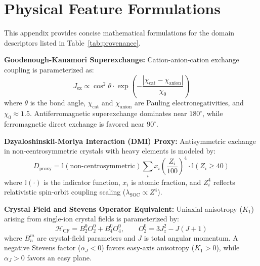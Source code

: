\documentclass[11pt,a4paper]{article}
\begin{document}
\newpage
\appendix

\section{Physical Feature Formulations}
\label{sec:appendix_physics}

This appendix provides concise mathematical formulations for the domain descriptors listed in Table~\ref{tab:provenance}.

\vspace{0.2cm}
\noindent\textbf{Goodenough-Kanamori Superexchange:} Cation-anion-cation exchange coupling is parameterized as:
\begin{equation}
    J_{\text{ex}} \propto \cos^2\theta \cdot \exp\left( - \frac{|\chi_{\text{cat}} - \chi_{\text{anion}}|}{\chi_0} \right)
\end{equation}
where $\theta$ is the bond angle, $\chi_{\text{cat}}$ and $\chi_{\text{anion}}$ are Pauling electronegativities, and $\chi_0 \approx 1.5$. Antiferromagnetic superexchange dominates near $180^\circ$, while ferromagnetic direct exchange is favored near $90^\circ$.

\vspace{0.2cm}
\noindent\textbf{Dzyaloshinskii-Moriya Interaction (DMI) Proxy:} Antisymmetric exchange in non-centrosymmetric crystals with heavy elements is modeled by:
\begin{equation}
    D_{\text{proxy}} = \mathbb{I}(\text{non-centrosymmetric}) \sum_{i} x_i \left( \frac{Z_i}{100} \right)^4 \cdot \mathbb{I}(Z_i \ge 40)
\end{equation}
where $\mathbb{I}(\cdot)$ is the indicator function, $x_i$ is atomic fraction, and $Z_i^4$ reflects relativistic spin-orbit coupling scaling ($\lambda_{\text{SOC}} \propto Z^4$).

\vspace{0.2cm}
\noindent\textbf{Crystal Field and Stevens Operator Equivalent:} Uniaxial anisotropy ($K_1$) arising from single-ion crystal fields is parameterized by:
\begin{equation}
    \mathcal{H}_{\text{CF}} = B_2^0 O_2^0 + B_4^0 O_4^0, \qquad O_2^0 = 3 J_z^2 - J(J+1)
\end{equation}
where $B_n^m$ are crystal-field parameters and $J$ is total angular momentum. A negative Stevens factor ($\alpha_J < 0$) favors easy-axis anisotropy ($K_1 > 0$), while $\alpha_J > 0$ favors an easy plane.
\end{document}

